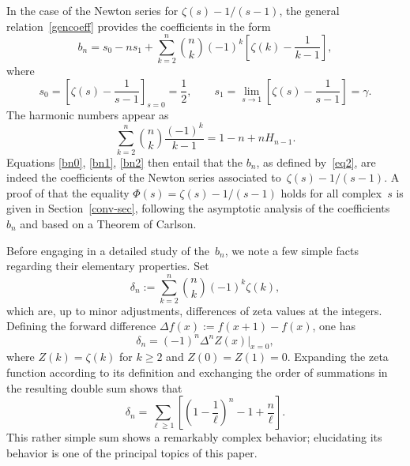 \documentclass{amsart}
\begin{document}

In the case of the Newton series for $\zeta(s)-1/(s-1)$, the general
relation~\eqref{gencoeff} provides the coefficients in the form
\begin{equation}\label{bn0}
b_n = s_0-ns_1+\sum_{k=2}^n \binom{n}{k} (-1)^k \left[\zeta(k)-\frac{1}{k-1}
\right],
\end{equation}
where
\begin{equation}\label{bn1}
s_0=\left[\zeta(s)-\frac{1}{s-1}\right]_{s=0}=\frac12,
\qquad
s_1=\lim_{s\to 1} \left[\zeta(s)-\frac{1}{s-1}\right] = \gamma.
\end{equation}
The harmonic numbers appear as
\begin{equation}\label{bn2}
\sum_{k=2}^n \binom{n}{k}\frac{(-1)^k}{k-1}=1-n+nH_{n-1}.
\end{equation}
Equations \eqref{bn0}, \eqref{bn1},   \eqref{bn2} 
then entail that   the
$b_n$, as  defined by~\eqref{eq2}, are indeed the  coefficients  of the Newton series
associated to~$\zeta(s)-1/(s-1)$. A proof of that the equality
$\Phi(s)=\zeta(s)-1/(s-1)$ holds for all complex~$s$ is given in Section~\ref{conv-sec},
following the asymptotic analysis of the coefficients~$b_n$ and based on
a Theorem of Carlson.

\smallskip

Before engaging in a detailed study of the~$b_n$, we note a few 
simple facts regarding their elementary properties. Set
\begin{equation}\label{deldef}
\delta_n:=\sum_{k=2}^n \binom{n}{k} (-1)^k \zeta(k),
\end{equation}
which are, up to minor adjustments, differences of zeta values at the
integers.  Defining the forward difference $\Delta f(x):=f(x+1)-f(x)$,
one has
\[
\delta_n= (-1)^n \Delta^n Z(x) \bigg|_{x=0},\]
where $Z(k)=\zeta(k)$ for $k\ge2$ and $Z(0)=Z(1)=0$.
Expanding the zeta function according to its definition and 
exchanging the order of summations in the resulting double sum shows that
\begin{equation}\label{simpdel}
\delta_n = \sum_{\ell\ge1} \left[\left(1-\frac{1}{\ell}\right)^n-1+\frac{n}{\ell}\right].
\end{equation}
This rather simple sum shows a remarkably complex behavior;
elucidating its behavior is one of the principal topics of this paper.
\end{document}
